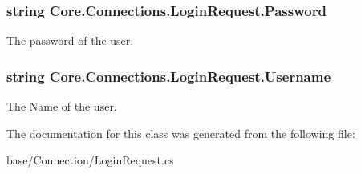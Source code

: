 \subsubsection[{Password}]{\setlength{\rightskip}{0pt plus 5cm}string Core.\+Connections.\+Login\+Request.\+Password}\label{classCore_1_1Connections_1_1LoginRequest_af3a2a4f734dcca3404687bfb8844b2ee}


The password of the user. 

\hypertarget{classCore_1_1Connections_1_1LoginRequest_aead391392278a11f91e5570e44942f91}{}
\subsubsection[{Username}]{\setlength{\rightskip}{0pt plus 5cm}string Core.\+Connections.\+Login\+Request.\+Username}\label{classCore_1_1Connections_1_1LoginRequest_aead391392278a11f91e5570e44942f91}


The Name of the user. 



The documentation for this class was generated from the following file\+:\begin{DoxyCompactItemize}
\item 
base/\+Connection/Login\+Request.\+cs\end{DoxyCompactItemize}
